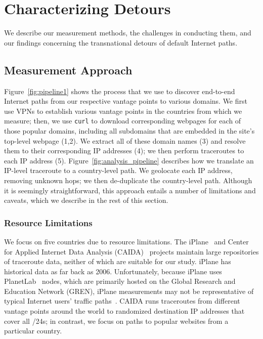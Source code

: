 \section{Characterizing Detours}
\label{datasets}
We  describe our measurement methods, the challenges in
conducting them, and our findings concerning the transnational detours
of default Internet paths.

\subsection{Measurement Approach}
\label{pipeline}

Figure~\ref{fig:pipeline1} shows the process that we use to discover end-to-end
Internet paths from our respective vantage points to various domains. We first use
VPNs
to establish various vantage points in the countries from which we measure; then,
we use
{\tt curl} to download corresponding webpages for each of those popular domains,
including all subdomains that are embedded in the site's top-level webpage (1,2). We extract
all of these domain names (3) and resolve them to their corresponding IP addresses (4);
we then perform traceroutes to each IP address (5).
Figure~\ref{fig:analysis_pipeline} describes how we translate an IP-level traceroute
to a country-level path. We geolocate each IP address, removing unknown hops; we
then de-duplicate the country-level path. Although it is seemingly straightforward,
this approach entails a number of limitations and caveats, which we describe in
the
rest of this section.

\subsubsection{Resource Limitations}
\label{resource_limits}

We focus on five countries due to resource limitations.
The iPlane~\cite{madhyastha2006iplane} and Center for Applied Internet Data
Analysis (CAIDA)~\cite{caida} projects maintain large repositories of
traceroute data, neither of which are suitable for our study.   iPlane has
historical data as far back as 2006. Unfortunately, because iPlane uses
PlanetLab~\cite{PlanetLab} nodes, which are primarily hosted on the Global
Research and Education Network (GREN), iPlane measurements may not be
representative of typical Internet users' traffic
paths~\cite{banerjee2004interdomain}.  CAIDA runs traceroutes from different
vantage points around the world to randomized destination IP addresses that
cover all /24s; in contrast, we focus on paths to popular websites from a
particular country.

